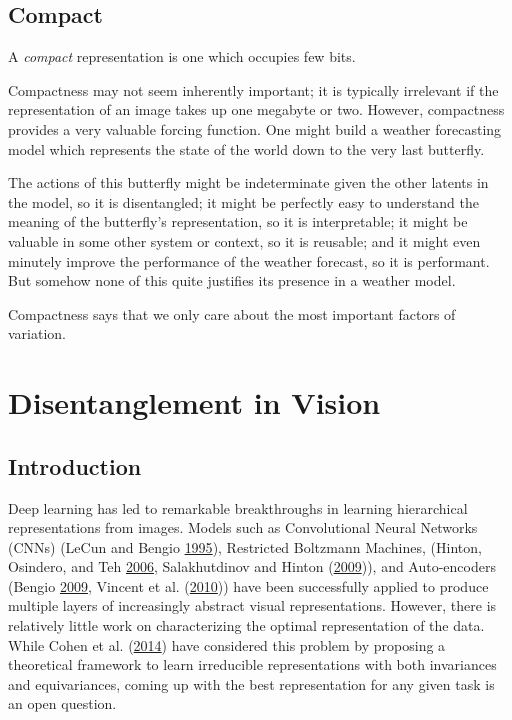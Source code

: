 \documentclass[12pt,twoside]{mitthesis}
\begin{document}
\section{Compact}\label{compact}

A \emph{compact} representation is one which occupies few bits.

Compactness may not seem inherently important; it is typically
irrelevant if the representation of an image takes up one megabyte or
two. However, compactness provides a very valuable forcing function. One
might build a weather forecasting model which represents the state of
the world down to the very last butterfly.

The actions of this butterfly might be indeterminate given the other
latents in the model, so it is disentangled; it might be perfectly easy
to understand the meaning of the butterfly's representation, so it is
interpretable; it might be valuable in some other system or context, so
it is reusable; and it might even minutely improve the performance of
the weather forecast, so it is performant. But somehow none of this
quite justifies its presence in a weather model.

Compactness says that we only care about the most important factors of
variation.

\chapter{Disentanglement in Vision}\label{disentanglement-in-vision}

\section{Introduction}\label{introduction-1}

Deep learning has led to remarkable breakthroughs in learning
hierarchical representations from images. Models such as Convolutional
Neural Networks (CNNs) (LeCun and Bengio
\protect\hyperlink{ref-lecun1995convolutional}{1995}), Restricted
Boltzmann Machines, (Hinton, Osindero, and Teh
\protect\hyperlink{ref-hinton2006fast}{2006}, Salakhutdinov and Hinton
(\protect\hyperlink{ref-salakhutdinov2009deep}{2009})), and
Auto-encoders (Bengio \protect\hyperlink{ref-bengio2009learning}{2009},
Vincent et al. (\protect\hyperlink{ref-vincent2010stacked}{2010})) have
been successfully applied to produce multiple layers of increasingly
abstract visual representations. However, there is relatively little
work on characterizing the optimal representation of the data. While
Cohen et al. (\protect\hyperlink{ref-cohen2014learning}{2014}) have
considered this problem by proposing a theoretical framework to learn
irreducible representations with both invariances and equivariances,
coming up with the best representation for any given task is an open
question.
\end{document}
